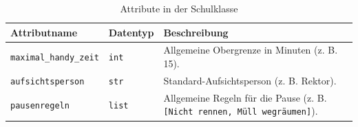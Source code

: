 \begin{table}[h]
    \centering
    \caption{Attribute in der Schulklasse}
    \label{tab:attribute_uebersicht}
    \begin{tabular}{|l|l|p{9cm}|l|} 
        \hline
        \textbf{Attributname} & \textbf{Datentyp} & \textbf{Beschreibung} \\
        \hline
        \texttt{maximal\_handy\_zeit} & \texttt{int} & Allgemeine Obergrenze in Minuten (z. B. 15). \\
        \hline
        \texttt{aufsichtsperson} & \texttt{str} & Standard-Aufsichtsperson (z. B. Rektor).  \\
        \hline
        \texttt{pausenregeln} & \texttt{list} & Allgemeine Regeln für die Pause (z. B. \texttt{[Nicht rennen, Müll wegräumen]}). \\
        \hline
    \end{tabular}
\end{table}